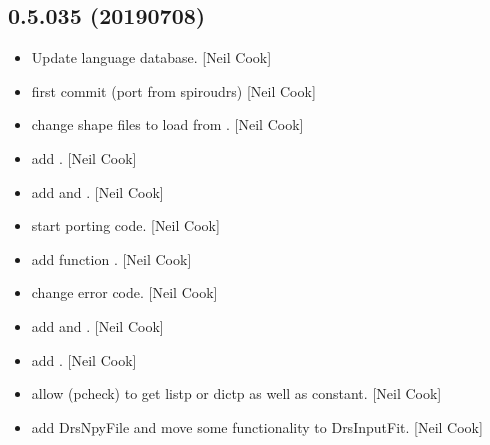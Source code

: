 \documentclass[a4paper,10pt,english]{report}
\begin{document}
\subsection{0.5.035 (2019\sphinxhyphen{}07\sphinxhyphen{}08)}
\label{\detokenize{misc/changelog:id123}}\begin{itemize}
\item {} 
Update language database. {[}Neil Cook{]}

\item {} 
 \sphinxhyphen{} first commit (port from spiroudrs) {[}Neil Cook{]}

\item {} 
 \sphinxhyphen{} change shape files to load from
. {[}Neil Cook{]}

\item {} 
 \sphinxhyphen{} add . {[}Neil Cook{]}

\item {} 
 \sphinxhyphen{} add  and .
{[}Neil Cook{]}

\item {} 
 \sphinxhyphen{} start porting code. {[}Neil
Cook{]}

\item {} 
 \sphinxhyphen{} add function . {[}Neil Cook{]}

\item {} 
 \sphinxhyphen{} change error code. {[}Neil Cook{]}

\item {} 
 \sphinxhyphen{} add  and . {[}Neil
Cook{]}

\item {} 
 \sphinxhyphen{} add . {[}Neil Cook{]}

\item {} 
 \sphinxhyphen{} allow  (pcheck) to get listp or dictp as well
as constant. {[}Neil Cook{]}

\item {} 
 \sphinxhyphen{} add DrsNpyFile and move some functionality to
DrsInputFit. {[}Neil Cook{]}


\end{itemize}
\end{document}
